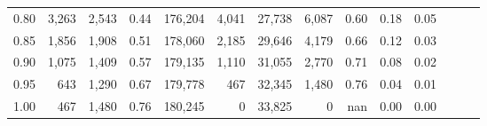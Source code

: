 \begin{tabular}{rrrrrrrrrrrrrr}
0.80 &   3,263 &  2,543 &  0.44 &  176,204 &    4,041 &  27,738 &   6,087 &  0.60 &  0.18 &      0.05 \\
0.85 &   1,856 &  1,908 &  0.51 &  178,060 &    2,185 &  29,646 &   4,179 &  0.66 &  0.12 &      0.03 \\
0.90 &   1,075 &  1,409 &  0.57 &  179,135 &    1,110 &  31,055 &   2,770 &  0.71 &  0.08 &      0.02 \\
0.95 &     643 &  1,290 &  0.67 &  179,778 &      467 &  32,345 &   1,480 &  0.76 &  0.04 &      0.01 \\
1.00 &     467 &  1,480 &  0.76 &  180,245 &        0 &  33,825 &       0 &   nan &  0.00 &      0.00 \\
\bottomrule
\end{tabular}
